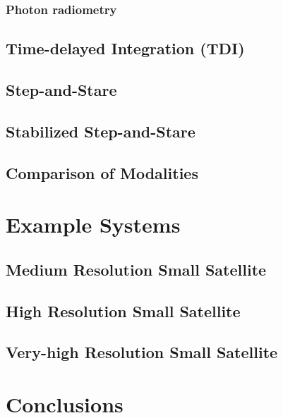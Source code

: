 \documentclass[10pt,journal]{IEEEtran}  %
\begin{document}
\subsubsection{Photon radiometry}

\subsection{Time-delayed Integration (TDI)}
\label{sec:tdi}

\subsection{Step-and-Stare}
\label{sec:step_stare}

\subsection{Stabilized Step-and-Stare}
\label{sec:stab_step_stare}

\subsection{Comparison of Modalities}
\label{sec:comp_modalities}

\section{Example Systems}
\label{sec:examples}

\subsection{Medium Resolution Small Satellite}
\label{sec:med_res}

\subsection{High Resolution Small Satellite}
\label{sec:high_res}

\subsection{Very-high Resolution Small Satellite}
\label{sec:vhigh_res}

\section{Conclusions}
\label{sec:conclusions}


\end{document}
